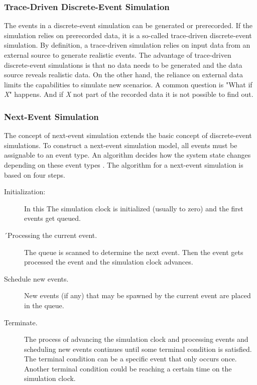 \subsubsection{Trace-Driven Discrete-Event Simulation}

The events in a discrete-event simulation can be generated or prerecorded. If the simulation relies on prerecorded data, it is a so-called trace-driven discrete-event simulation.
By definition, a trace-driven simulation relies on input data from an external source to generate realistic events. \cite[chapter 1]{leemis2006discrete} The advantage of trace-driven discrete-event simulations is that no data needs to be generated and the data source reveals realistic data. On the other hand, the reliance on external data limits the capabilities to simulate new scenarios. A common question is "What if \textit{X}" happens. And if \textit{X} not part of the recorded data it is not possible to find out.


\subsubsection{Next-Event Simulation}
\label{des:nextevent}

The concept of next-event simulation extends the basic concept of discrete-event simulations. To construct a next-event simulation model, all events must be assignable to an event type. An algorithm decides how the system state changes depending on these event types
\cite[chapter 5]{leemis2006discrete}.
The algorithm for a next-event simulation is based on four steps.
\begin{description}
\item[Initialization:] In this The simulation clock is initialized (usually to zero) and the first events get queued.
\item[´Processing the current event.] The queue is scanned to determine the next event. Then the event gets processed the event and the simulation clock advances.
\item[Schedule new events.] New events (if any) that may be spawned by the current event are placed in the queue.
\item[Terminate.] The process of advancing the simulation clock and processing events and scheduling new events continues until some terminal condition is satisfied. The terminal condition can be a specific event that only occurs once. Another terminal condition could be reaching a certain time on the simulation clock.

\end{description}

